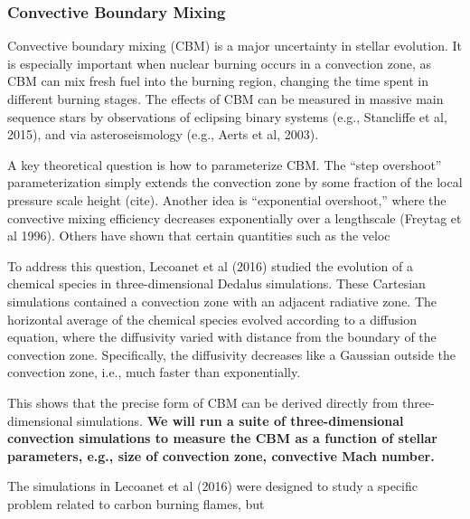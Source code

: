 {\color{purple}
\subsubsection{Convective Boundary Mixing}
}

Convective boundary mixing (CBM) is a major uncertainty in stellar evolution. It is especially important when nuclear burning occurs in a convection zone, as CBM can mix fresh fuel into the burning region, changing the time spent in different burning stages. The effects of CBM can be measured in massive main sequence stars by observations of eclipsing binary systems (e.g., Stancliffe et al, 2015), and via asteroseismology (e.g., Aerts et al, 2003).

A key theoretical question is how to parameterize CBM. The ``step overshoot'' parameterization simply extends the convection zone by some fraction of the local pressure scale height (cite). Another idea is ``exponential overshoot,'' where the convective mixing efficiency decreases exponentially over a lengthscale (Freytag et al 1996). Others have shown that certain quantities such as the veloc

To address this question, Lecoanet et al (2016) studied the evolution of a chemical species in three-dimensional Dedalus simulations.  These Cartesian simulations contained a convection zone with an adjacent radiative zone. The horizontal average of the chemical species evolved according to a diffusion equation, where the diffusivity varied with distance from the boundary of the convection zone. Specifically, the diffusivity decreases like a Gaussian outside the convection zone, i.e., much faster than exponentially.

This shows that the precise form of CBM can be derived directly from three-dimensional simulations. \textbf{We will run a suite of three-dimensional convection simulations to measure the CBM as a function of stellar parameters, e.g., size of convection zone, convective Mach number.} 

The simulations in Lecoanet et al (2016) were designed to study a specific problem related to carbon burning flames, but 
